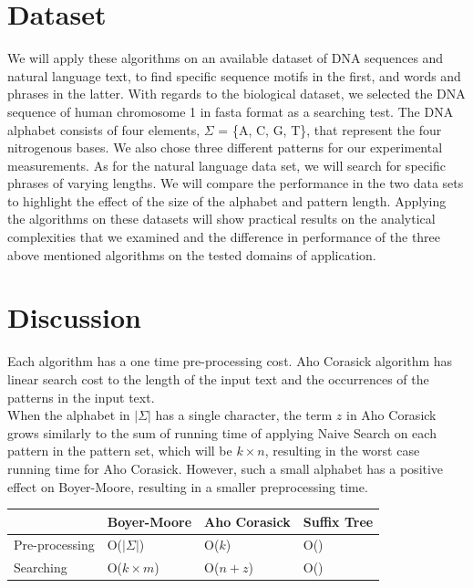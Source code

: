 \documentclass[paper=a4, fontsize=11pt]{scrartcl} %
\numberwithin{equation}{section} %
\numberwithin{figure}{section} %
\numberwithin{table}{section} %
\begin{document}
\newpage
\section{Dataset}
We will apply these algorithms on an available dataset of DNA sequences and natural language text, to find specific sequence motifs in the first, and words and phrases in the latter. With regards to the biological dataset, we selected  the DNA sequence of  human chromosome 1 in fasta format as a searching test. The DNA alphabet consists of four elements, $\Sigma$ = \{A, C, G, T\}, that represent  the four nitrogenous bases. We also chose three different patterns for our experimental measurements. As for the natural language data set, we will search for specific phrases of varying lengths. We will compare the performance in the two data sets to highlight the effect of the size of the alphabet and pattern length.
Applying the algorithms on these datasets will show practical results on the analytical complexities that we examined and the difference in performance of the three above mentioned algorithms on the tested domains of application.

\newpage
\section{Discussion}
Each algorithm has a one time pre-processing cost. Aho Corasick algorithm has linear search cost to the length of the input text and the occurrences of the patterns in the input text. \\
When the alphabet in $|\Sigma|$ has a single character, the term $z$ in Aho Corasick grows similarly to the sum of running time of applying Naive Search on each pattern in the pattern set, which will be $k\times n$, resulting in the worst case running time for Aho Corasick. However, such a small alphabet has a positive effect on Boyer-Moore, resulting in a smaller preprocessing time.

\begin{center}
	\begin{tabular}{| l | l | l | l |}
		\hline
		& Boyer-Moore & Aho Corasick & Suffix Tree \\
		\hline
		Pre-processing & O($|\Sigma|$) & O($k$) & O() \\
		\hline
		Searching & O($k\times m$) & O($n + z$) & O() \\
		\hline
	\end{tabular}
\end{center}

\newpage

\end{document}
